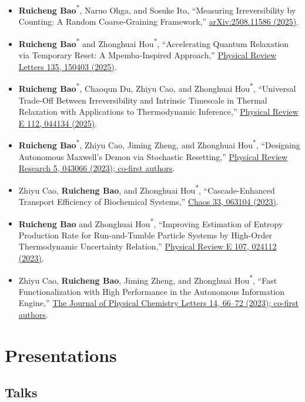 \documentclass[10pt,a4paper]{article}
\newcommand{\pub}[4]{%
  \item #1, ``#2,'' \href{#4}{#3}.
}
\newcommand{\corr}[1]{#1\textsuperscript{*}}
\begin{document}
\begin{itemize}
  \pub{\corr{\textbf{Ruicheng Bao}}, Naruo Ohga, and Sosuke Ito}{Measuring Irreversibility by Counting: A Random Coarse-Graining Framework}{arXiv:2508.11586 (2025)}{https://arxiv.org/abs/2508.11586}
  \pub{\corr{\textbf{Ruicheng Bao}} and \corr{Zhonghuai Hou}}{Accelerating Quantum Relaxation via Temporary Reset: A Mpemba-Inspired Approach}{Physical Review Letters 135, 150403 (2025)}{https://doi.org/10.1103/g94p-7421}
  \pub{\corr{\textbf{Ruicheng Bao}}, Chaoqun Du, Zhiyu Cao, and \corr{Zhonghuai Hou}}{Universal Trade-Off Between Irreversibility and Intrinsic Timescale in Thermal Relaxation with Applications to Thermodynamic Inference}{Physical Review E 112, 044134 (2025)}{https://doi.org/10.1103/fmsz-rdbj}
  \pub{\corr{\textbf{Ruicheng Bao}}, Zhiyu Cao, Jiming Zheng, and \corr{Zhonghuai Hou}}{Designing Autonomous Maxwell's Demon via Stochastic Resetting}{Physical Review Research 5, 043066 (2023); co-first authors}{https://doi.org/10.1103/PhysRevResearch.5.043066}
  \pub{Zhiyu Cao, \textbf{Ruicheng Bao}, and \corr{Zhonghuai Hou}}{Cascade-Enhanced Transport Efficiency of Biochemical Systems}{Chaos 33, 063104 (2023)}{https://doi.org/10.1063/5.0146769}
  \pub{\textbf{Ruicheng Bao} and \corr{Zhonghuai Hou}}{Improving Estimation of Entropy Production Rate for Run-and-Tumble Particle Systems by High-Order Thermodynamic Uncertainty Relation}{Physical Review E 107, 024112 (2023)}{https://doi.org/10.1103/PhysRevE.107.024112}
  \pub{Zhiyu Cao, \textbf{Ruicheng Bao}, Jiming Zheng, and \corr{Zhonghuai Hou}}{Fast Functionalization with High Performance in the Autonomous Information Engine}{The Journal of Physical Chemistry Letters 14, 66--72 (2023); co-first authors}{https://doi.org/10.1021/acs.jpclett.2c03335}
\end{itemize}

\section{Presentations}

\subsection{Talks}
\end{document}

